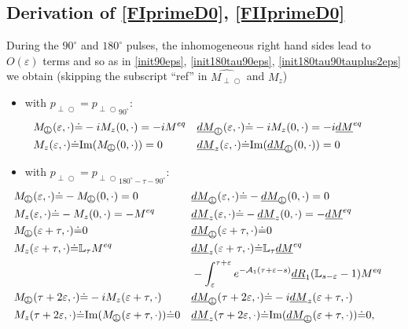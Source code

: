 \documentclass{ws-m3as}
\newcommand{\uld}[1]{\underline{d#1}}
\renewcommand\Im{\mathrm{Im}}
\def\Mpp{M_{\perp\!\!\!\!\!\bigcirc}}
\def\Mphp{\widehat{\Mpp}}
\def\pp{p_{\perp\!\!\!\!\!\bigcirc}}
\def\uldMpp{\uld{M}_{\perp\!\!\!\!\!\bigcirc}}
\newcommand\taup{\varepsilon}
\begin{document}
\subsection{Derivation of \eqref{FIprimeD0}, \eqref{FIIprimeD0}}
During the $90^\circ$ and $180^\circ$ pulses, the inhomogeneous right hand sides lead to $O(\taup)$ terms and so as in \eqref{init90eps}, \eqref{init180tau90eps}, \eqref{init180tau90tauplus2eps} we obtain (skipping the subscript ``ref'' in $\Mphp$ and $M_z$)
\begin{itemize}
\item with $\pp={\pp}_{90^\circ}$:
\begin{equation*}%
\hspace*{-1cm}\begin{aligned}
&\Mpp(\taup,\cdot)\dot{=}-iM_z(0,\cdot)=-iM^{eq}
&&\uldMpp(\taup,\cdot)\dot{=}-iM_z(0,\cdot)=-i\uld{M}^{eq}\\
&M_z(\taup,\cdot)\dot{=}\Im(\Mpp(0,\cdot))=0
&&\uld{M}_z(\taup,\cdot)\dot{=}\Im(\uldMpp(0,\cdot))=0
\end{aligned}
\end{equation*}
%
\item with $\pp={\pp}_{180^\circ-\tau-90^\circ}$:
\begin{equation*}%
\hspace*{-1cm}\begin{aligned}
&\Mpp(\taup,\cdot)\dot{=}-\Mpp(0,\cdot)=0
&&\uldMpp(\taup,\cdot)\dot{=}-\uldMpp(0,\cdot)=0\\
&M_z(\taup,\cdot)\dot{=}-M_z(0,\cdot)=-M^{eq}
&&\uld{M}_z(\taup,\cdot)\dot{=}-\uld{M}_z(0,\cdot)=-\uld{M}^{eq}\\
&\Mpp(\taup+\tau,\cdot)\dot{=}0
&&\uldMpp(\taup+\tau,\cdot)\dot{=}0\\
&M_z(\taup+\tau,\cdot)\dot{=}\mathbb{L}_\tau M^{eq}
&&\uld{M}_z(\taup+\tau,\cdot)\dot{=}\mathbb{L}_\tau \uld{M}^{eq}\\
&&&
-\int_\taup^{\tau+\taup}e^{-\mathcal{A}_1(\tau+\taup-s)}\uld{R}_1(\mathbb{L}_{s-\taup}-1)M^{eq}\\
&\Mpp(\tau+2\taup,\cdot)\dot{=}-iM_z(\taup+\tau,\cdot)
&&\uldMpp(\tau+2\taup,\cdot)\dot{=}-i\uld{M}_z(\taup+\tau,\cdot)\\
&M_z(\tau+2\taup,\cdot)\dot{=}\Im(\Mpp(\taup+\tau,\cdot))\dot{=}0
&&\uld{M}_z(\tau+2\taup,\cdot)\dot{=}\Im(\uldMpp(\taup+\tau,\cdot))\dot{=}0,
\end{aligned}
\end{equation*}
\end{itemize}
\end{document}
